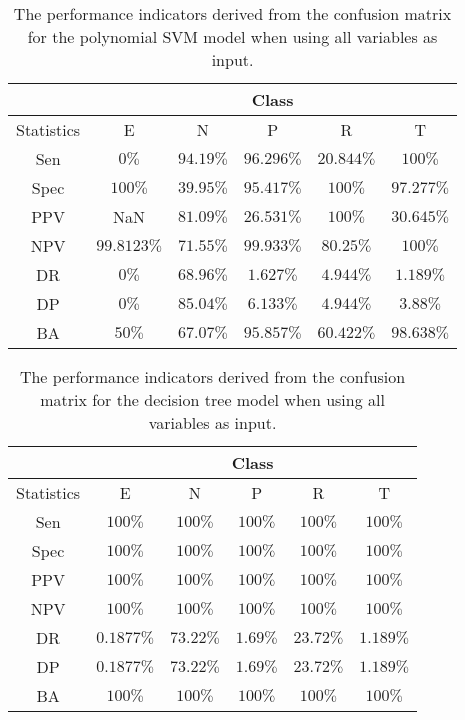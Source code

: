 \begin{table}[!ht]
	\centering
	\begin{tabular}{|c|c|c|c|c|c|}
		\hline
		 & \multicolumn{5}{c|}{Class} \\ \hline
		Statistics & E & N & P & R & T \\ \hline
		Sen & $0\%$ & $94.19\%$ & $96.296\%$ & $20.844\%$ & $100\%$ \\ \hline
		Spec & $100\%$ & $39.95\%$ & $95.417\%$ & $100\%$ & $97.277\%$ \\ \hline
		PPV & NaN & $81.09\%$ & $26.531\%$ & $100\%$ & $30.645\%$ \\ \hline
		NPV & $99.8123\%$ & $71.55\%$ & $99.933\%$ & $80.25\%$ & $100\%$ \\ \hline
		DR & $0\%$ & $68.96\%$ & $1.627\%$ & $4.944\%$ & $1.189\%$ \\ \hline
		DP & $0\%$ & $85.04\%$ & $6.133\%$ & $4.944\%$ & $3.88\%$ \\ \hline
		BA & $50\%$ & $67.07\%$ & $95.857\%$ & $60.422\%$ & $98.638\%$ \\ \hline
	\end{tabular}
	\caption{The performance indicators derived from the confusion matrix for the polynomial SVM model when using all variables as input.}
	\label{tab:cs:reverse:all:svmPoly}
\end{table}

\begin{table}[!ht]
	\centering
	\begin{tabular}{|c|c|c|c|c|c|}
		\hline
		 & \multicolumn{5}{c|}{Class} \\ \hline
		Statistics & E & N & P & R & T \\ \hline
		Sen & $100\%$ & $100\%$ & $100\%$ & $100\%$ & $100\%$ \\ \hline
		Spec & $100\%$ & $100\%$ & $100\%$ & $100\%$ & $100\%$ \\ \hline
		PPV & $100\%$ & $100\%$ & $100\%$ & $100\%$ & $100\%$ \\ \hline
		NPV & $100\%$ & $100\%$ & $100\%$ & $100\%$ & $100\%$ \\ \hline
		DR & $0.1877\%$ & $73.22\%$ & $1.69\%$ & $23.72\%$ & $1.189\%$ \\ \hline
		DP & $0.1877\%$ & $73.22\%$ & $1.69\%$ & $23.72\%$ & $1.189\%$ \\ \hline
		BA & $100\%$ & $100\%$ & $100\%$ & $100\%$ & $100\%$ \\ \hline
	\end{tabular}
	\caption{The performance indicators derived from the confusion matrix for the decision tree model when using all variables as input.}
	\label{tab:cs:reverse:all:C5.0}
\end{table}

